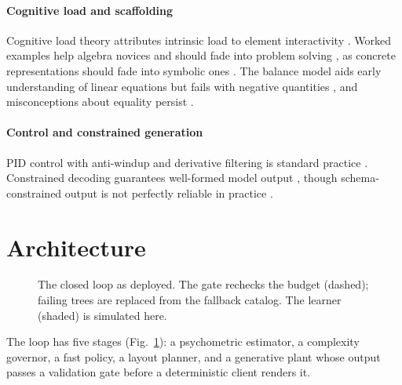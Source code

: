 \documentclass[conference]{IEEEtran}
\begin{document}
\paragraph*{Cognitive load and scaffolding}
Cognitive load theory \cite{sweller1988cognitive}
attributes intrinsic load to element interactivity \cite{sweller2010element}.
Worked examples help algebra novices \cite{sweller1985worked} and should fade
into problem solving \cite{renkl2003structuring,salden2010expertise}, as
concrete representations should fade into symbolic ones
\cite{fyfe2014concreteness}. The balance model aids early understanding of
linear equations but fails with negative quantities \cite{vlassis2002balance},
and misconceptions about equality persist
\cite{kieran1981equality,booth2014persistent}.

\paragraph*{Control and constrained generation}
PID control with anti-windup and derivative filtering is standard practice
\cite{astrom2006advanced,astrom1989windup}. Constrained
decoding guarantees well-formed model output
\cite{willard2023guided}, though schema-constrained output is not perfectly
reliable in practice \cite{geng2025jsonschemabench}.

\section{Architecture}

\begin{figure}[t]
\centering
\scalebox{0.9}{}
\caption{The closed loop as deployed. The gate rechecks the budget
(dashed); failing trees are replaced from the fallback catalog. The learner
(shaded) is simulated here.}
\label{fig:arch}
\end{figure}

The loop has five stages (Fig.~\ref{fig:arch}): a psychometric
estimator, a complexity governor, a fast policy, a layout planner, and a
generative plant whose output passes a validation gate before a
deterministic client renders it.
\end{document}

